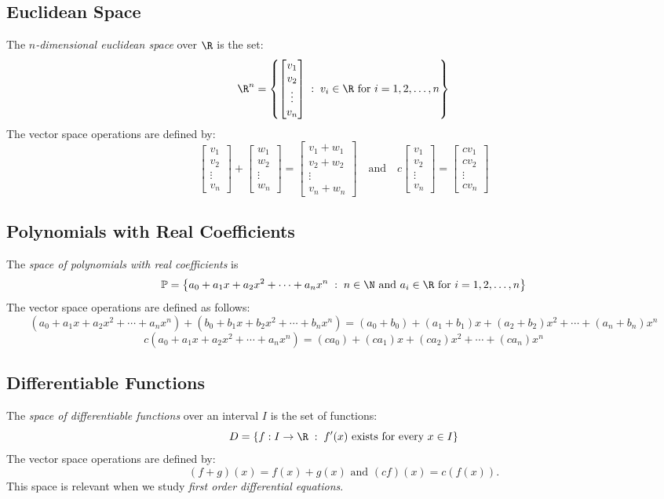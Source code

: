 \documentclass[12pt]{article}
\begin{document}
\subsection{Euclidean Space}
The \emph{$n$-dimensional euclidean space} over $\R$ is the set:
\[
\R^n=\left\{
\begin{bmatrix}v_1\\v_2\\\vdots\\v_n\end{bmatrix}
\;:\; v_i\in\R\text{ for } i=1,2,\ldots,n
\right\}
\]
The vector space operations are defined by:
\[
\begin{bmatrix}v_1\\v_2\\\vdots\\v_n\end{bmatrix}+
\begin{bmatrix}w_1\\w_2\\\vdots\\w_n\end{bmatrix}=
\begin{bmatrix}v_1+w_1\\v_2+w_2\\\vdots\\v_n+w_n\end{bmatrix}
\quad\text{and}\quad
c\begin{bmatrix}v_1\\v_2\\\vdots\\v_n\end{bmatrix}=
\begin{bmatrix}cv_1\\cv_2\\\vdots\\cv_n\end{bmatrix}
\]

\subsection{Polynomials with Real Coefficients}
The \emph{space of polynomials with real coefficients} is
\[
\mathbb{P}=
\left\{
a_0+a_1x+a_2x^2+\cdots+a_nx^n
\;:\;
n\in\N\text{ and } a_i\in\R \text{ for } i=1,2,\ldots,n
\right\}
\]
The vector space operations are defined as follows:
\[
(a_0+a_1x+a_2x^2+\cdots+a_nx^n)+
(b_0+b_1x+b_2x^2+\cdots+b_nx^n)=
(a_0+b_0)+(a_1+b_1)x+(a_2+b_2)x^2+\cdots+(a_n+b_n)x^n
\]
\[
c(a_0+a_1x+a_2x^2+\cdots+a_nx^n)=(ca_0)+(ca_1)x+(ca_2)x^2+\cdots+(ca_n)x^n
\]

\subsection{Differentiable Functions}

The \emph{space of differentiable functions} over an interval $I$ is the set of functions:
\[
D=\left\{
f:I\to\R 
\;:\;
f'(x)\text{ exists for every } x\in I
\right\}
\]
The vector space operations are defined by:
\[
(f+g)(x)=f(x)+g(x)\text{ and }(cf)(x)=c(f(x)).
\]
This space is relevant when we study \emph{first order differential equations}.
\end{document}
